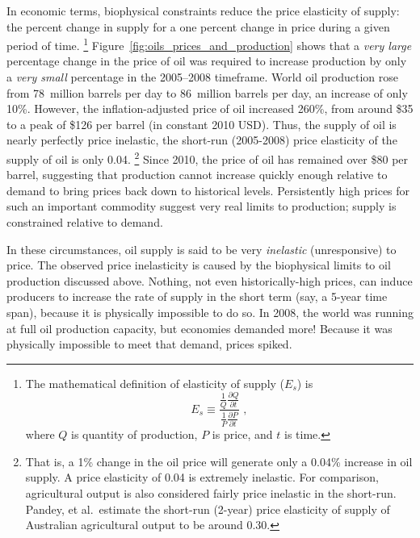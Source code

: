 In economic terms, biophysical constraints reduce the 
price elasticity of supply: 
the percent change in supply for a one percent change in price
during a given period of time.%
	\footnote{
	The mathematical definition of elasticity of supply ($E_s$) is
	\begin{equation*}
		E_s \equiv \frac{\frac{1}{Q}\frac{\partial Q}{\partial t}}
					{\frac{1}{P}\frac{\partial P}{\partial t}} \; ,
	\end{equation*}
	where $Q$ is quantity of production, $P$ is price, and $t$ is time.
	}
Figure~\ref{fig:oils_prices_and_production} shows that 
a \emph{very large} percentage change in the price of oil was required to 
increase production by only a \emph{very small} percentage
in the 2005--2008 timeframe.
World oil production rose from 
78~million barrels per day to 86~million barrels per day,
an increase of only 10\%.\cite{EIA2014}
However, the inflation-adjusted price of oil increased 260\%,
from around \$35 to a peak of \$126 per barrel 
(in constant 2010 USD).
Thus, the supply of oil is nearly perfectly price inelastic, 
the short-run (2005-2008) price elasticity of the supply of oil 
is only 0.04.%
	\footnote{
	That is, a 1\% change in the oil price will generate
	only a 0.04\% increase in oil supply. 
	A price elasticity of 0.04 is extremely inelastic. 
	For comparison, agricultural output is also considered fairly price inelastic 
	in the short-run. 
	Pandey, et al.\ estimate the short-run (2-year) 
	price elasticity of supply of Australian agricultural output 
	to be around 0.30.\cite[p.~215]{pandey1982}
	}
Since 2010, the price of oil has remained over \$80 per barrel,
suggesting that production cannot increase quickly enough relative to demand
to bring prices back down to historical levels.
Persistently high prices for such an important commodity
suggest very real limits to production; 
supply is constrained relative to demand. 

In these circumstances, 
oil supply is said to be very \emph{inelastic} (unresponsive) to price.
The observed price inelasticity is caused by 
the biophysical limits to oil production discussed above.
Nothing, not even historically-high prices, can induce producers to 
increase the rate of supply in the short term (say, a 5-year time span), 
because it is physically impossible to do so.
In 2008, the world was running at full oil production capacity, 
but economies demanded more!
Because it was physically impossible to meet that demand,
prices spiked.

